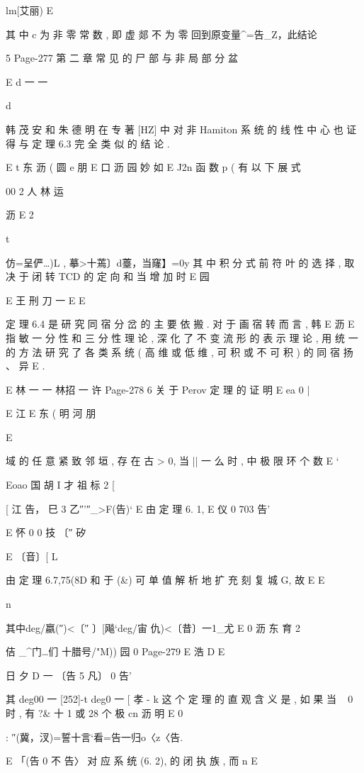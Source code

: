 {{{{{{{{{{{{{{lm[艾丽) E

其 中 c 为 非 零 常 数 , 即 虚 郯 不 为 零 回到原变量^=告_Z，此结论

5
Page-277
第 二 章 常 见 的 尸 部 与 非 局 部 分 盆

E d 一 一

d

韩 茂 安 和 朱 德 明 在 专 著 [HZ] 中 对 非 Hamiton 系 统 的 线 性 中
心 也 证 得 与 定 理 6.3 完 全 类 似 的 结 论 .

E t 东 沥 ( 圆 e 朋
E 口 沥 园 妙 如
E J2n
函 数 p ( 有 以 下 展 式

00 2 人 林 运

沥
E
2

t

仿=呈俨…)L , 摹>十蔫〕d薹，当窿】=0y
其 中 积 分 式 前 符 叶 的 选 择 , 取 决 于 闭 转 TCD 的 定 向 和 当 增 加 时
E 园

E 王 刑 刀 一
E
E

定 理 6.4 是 研 究 同 宿 分 岔 的 主 要 依 搬 . 对 于 画 宿 转 而 言 , 韩
E 沥
E
指 敏 一 分 性 和 三 分 性 理 论 , 深 化 了 不 变 流 形 的 表 示 理 论 , 用 统 一 的
方 法 研 究 了 各 类 系 统 ( 高 维 或 低 维 , 可 积 或 不 可 积 ) 的 同 宿 扬 、 异
E .

E 林 一 一
林招 一 许
Page-278
6 关 于 Perov 定 理 的 证 明
E ea 0 |

E 江
E 东 ( 明 河 朋

E

域 的 任 意 紧 致 邻 垣 , 存 在 古 > 0, 当 || 一 么 时 , 中 极 限 环 个 数
E `

Eoao 国 胡 I 才 祖 标 2
[

[ 江 告， 巳
3 乙″'″_>F(告)` E
由 定 理 6. 1,
E 仪 0 703 告'

E 怀 0 0 技 〔″ 矽

E 〔音〕[ L

由 定 理 6.7,75(8D 和 于 (&) 可 单 值 解 析 地 扩 充 刻 复 城 G, 故
E
E

n

其中deg/嬴(″)<〔″ 〕[飚`deg/宙 仇)<〔昔〕一1_尤 E
0 沥 东 育 2

佶 _^门…们 十腊号/"M)) 园 0
Page-279
E 浩 D E

日
夕 D 一 〔告 5 凡〕 0 告'

其 deg00 一 [252]-t deg0 一 [ 孝 - k
这 个 定 理 的 直 观 含 义 是 , 如 果 当 ~ 0 时 , 有 ?& 十 1 或 28 个 极
cn 沥 明
E
0

:
″(冀，汊)=誓十言`看=告一归o〈z〈告.

E 「(告 0 不 告〉 对 应 系 统 (6. 2), 的 闭 执 族 , 而
n
E

}}}}}}}}}}}}}}
